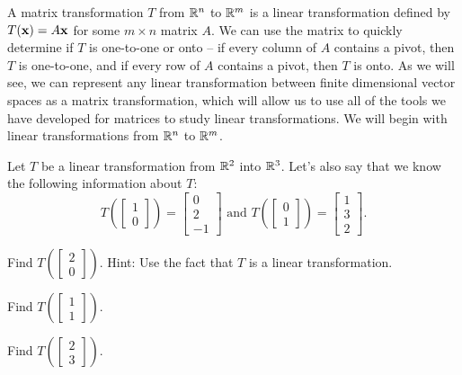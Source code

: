 \label{sec:mtxof_trans_intro}

A matrix transformation $T$ from $\mathbb{R}^n$ to $\mathbb{R}^m$ is a linear transformation defined by $T(\mathbf{x}) = A\mathbf{x}$ for some $m \times n$ matrix $A$. We can use the matrix to quickly determine if $T$ is one-to-one or onto -- if every column of $A$ contains a pivot, then $T$ is one-to-one, and if every row of $A$ contains a pivot, then $T$ is onto. As we will see, we can represent any linear transformation between finite dimensional vector spaces as a matrix transformation, which will allow us to use all of the tools we have developed for matrices to study linear transformations. We will begin with linear transformations from $\mathbb{R}^n$ to $\mathbb{R}^m$. 



\begin{pa} \label{pa:8_b} Let $T$ be a linear transformation from $\mathbb{R}^2$ into $\mathbb{R}^3$. Let's also say that we know the following information about $T$:
\[T\left(\left[ \begin{array}{c} 1 \\ 0 \end{array} \right] \right) = \left[ \begin{array}{r} 0 \\ 2 \\ -1 \end{array} \right] \text{ and }
T\left(\left[ \begin{array}{c} 0 \\ 1 \end{array} \right] \right) = \left[ \begin{array}{r} 1 \\ 3 \\ 2 \end{array} \right].\]
	\be
	\item Find  $T\left(\left[ \begin{array}{c} 2 \\ 0 \end{array} \right] \right)$. Hint: Use the fact that $T$ is a linear transformation.

	\item Find $T\left(\left[ \begin{array}{c} 1 \\ 1 \end{array} \right] \right)$.

	
	\item Find $T\left(\left[ \begin{array}{c} 2 \\ 3 \end{array} \right] \right)$.


\end{pa}
